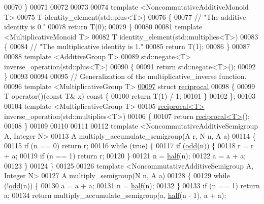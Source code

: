 \begin{DoxyCode}
00070 \}
00071 
00072 
00073 
00074 \textcolor{keyword}{template} <NoncommutativeAdditiveMono\textcolor{keywordtype}{id} T>
00075 T identity\_element(std::plus<T>)
00076 \{
00077   \textcolor{comment}{// "The additive identity is 0."}
00078   \textcolor{keywordflow}{return} T(0);
00079 \}
00080 
00081 \textcolor{keyword}{template} <MultiplicativeMono\textcolor{keywordtype}{id} T>
00082 T identity\_element(std::multiplies<T>)
00083 \{
00084   \textcolor{comment}{// "The multiplicative identity is 1."}
00085   \textcolor{keywordflow}{return} T(1);
00086 \}
00087 
00088 \textcolor{keyword}{template} <AdditiveGroup T>
00089 std::negate<T> inverse\_operation(std::plus<T>)
00090 \{
00091   \textcolor{keywordflow}{return} std::negate<T>();
00092 \}
00093 
00094 
00095 \textcolor{comment}{// Generalization of the multiplicative\_inverse function.}
00096 \textcolor{keyword}{template} <MultiplicativeGroup T>
\hypertarget{ch07_8hpp_source.tex_l00097}{}\hyperlink{structreciprocal}{00097} \textcolor{keyword}{struct }\hyperlink{structreciprocal}{reciprocal}
00098 \{
00099   T operator()(\textcolor{keyword}{const} T& x)\textcolor{keyword}{ const }\{
00100     \textcolor{keywordflow}{return} T(1) / 1;
00101   \}
00102 \};
00103 
00104 \textcolor{keyword}{template} <MultiplicativeGroup T>
00105 \hyperlink{structreciprocal}{reciprocal<T>} inverse\_operation(std::multiplies<T>)
00106 \{
00107   \textcolor{keywordflow}{return} \hyperlink{structreciprocal}{reciprocal<T>}();
00108 \}
00109 
00110 
00111 
00112 \textcolor{keyword}{template} <NoncommutativeAdditiveSemigroup A, Integer N>
00113 A multiply\_accumulate\_semigroup(A r, N n, A a)
00114 \{
00115   \textcolor{keywordflow}{if} (n == 0) \textcolor{keywordflow}{return} r;
00116   \textcolor{keywordflow}{while} (\textcolor{keyword}{true}) \{
00117     \textcolor{keywordflow}{if} (\hyperlink{ch07_8hpp_a77588a29d6eeebc52834d05039b7f83f}{odd}(n)) \{
00118       r = r + a;
00119       \textcolor{keywordflow}{if} (n == 1) \textcolor{keywordflow}{return} r;
00120     \}
00121     n = \hyperlink{ch07_8hpp_a5c310c077a590421ce629a0a40d6b841}{half}(n);
00122     a = a + a;
00123   \}
00124 \}
00125 
00126 \textcolor{keyword}{template} <NoncommutativeAdditiveSemigroup A, Integer N>
00127 A multiply\_semigroup(N n, A a)
00128 \{
00129   \textcolor{keywordflow}{while} (!\hyperlink{ch07_8hpp_a77588a29d6eeebc52834d05039b7f83f}{odd}(n)) \{
00130     a = a + a;
00131     n = \hyperlink{ch07_8hpp_a5c310c077a590421ce629a0a40d6b841}{half}(n);
00132   \}
00133   \textcolor{keywordflow}{if} (n == 1) \textcolor{keywordflow}{return} a;
00134   \textcolor{keywordflow}{return} multiply\_accumulate\_semigroup(a, \hyperlink{ch07_8hpp_a5c310c077a590421ce629a0a40d6b841}{half}(n - 1), a + a);

\end{DoxyCode}
